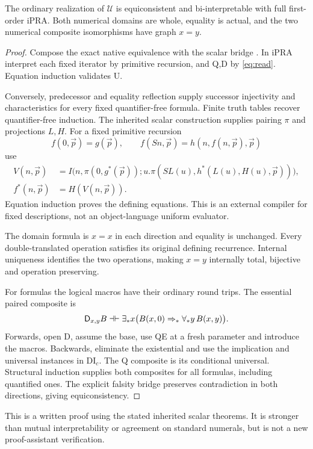 \begin{theorem}
The ordinary realization of $\mathcal U$ is equiconsistent and
bi-interpretable with full first-order iPRA. Both numerical domains are
whole, equality is actual, and the two numerical composite isomorphisms
have graph $x=y$.
\end{theorem}
\begin{proof}
Compose the exact native equivalence with the scalar bridge
\cite{bridge}. In iPRA interpret each fixed iterator by primitive
recursion, and Q,D by \eqref{eq:read}. Equation induction validates U.

Conversely, predecessor and equality reflection supply successor
injectivity and characteristics for every fixed quantifier-free formula.
Finite truth tables recover quantifier-free induction. The inherited
scalar construction supplies pairing $\pi$ and projections $L,H$.
For a fixed primitive recursion
\[
 f(0,\vec p)=g(\vec p),\qquad
 f(Sn,\vec p)=h(n,f(n,\vec p),\vec p)
\]
use
\[
\begin{split}
 V(n,\vec p)&=I\bigl(n,\pi(0,g^*(\vec p));
        u.\pi(SL(u),h^*(L(u),H(u),\vec p))\bigr),\\
 f^*(n,\vec p)&=H(V(n,\vec p)).
\end{split}
\]
Equation induction proves the defining equations. This is an external
compiler for fixed descriptions, not an object-language uniform evaluator.

The domain formula is $x=x$ in each direction and equality is unchanged.
Every double-translated operation satisfies its original defining
recurrence. Internal uniqueness identifies the two operations, making
$x=y$ internally total, bijective and operation preserving.

For formulas the logical macros have their ordinary round trips.
The essential paired composite is
\[
 \mathsf D_{x,y}B\dashv\vdash
 \exists_*x\bigl(B(x,0)\Rightarrow_*\forall_*y\,B(x,y)\bigr).
\]
Forwards, open D, assume the base, use QE at a fresh parameter and
introduce the macros. Backwards, eliminate the existential and use
the implication and universal instances in DI$_c$.
The Q composite is its conditional universal. Structural induction
supplies both composites for all formulas, including quantified ones.
The explicit falsity bridge preserves contradiction in both directions,
giving equiconsistency.
\end{proof}
This is a written proof using the stated inherited scalar theorems.
It is stronger than mutual interpretability or agreement on standard
numerals, but is not a new proof-assistant verification.

